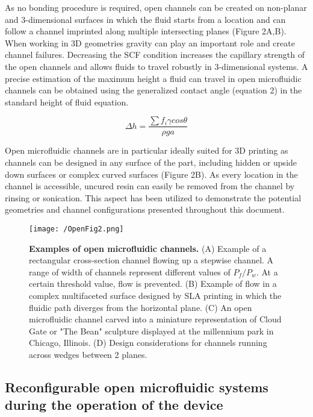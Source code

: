 As no bonding procedure is required, open channels can be created on non-planar and 3-dimensional surfaces in which the fluid starts from a location and can follow a channel imprinted along multiple intersecting planes (Figure 2A,B). When working in 3D geometries gravity can play an important role and create channel failures. Decreasing the SCF condition increases the capillary strength of the open channels and allows fluids to travel robustly in 3-dimensional systems. A precise estimation of the maximum height a fluid can travel in open microfluidic channels can be obtained using the generalized contact angle (equation 2) in the standard height of fluid equation.

\begin{equation}
    \Delta h = \frac{\sum f_{i}\gamma cos \theta}{\rho g a }
\end{equation}

Open microfluidic channels are in particular ideally suited for 3D printing as channels can be designed in any surface of the part, including hidden or upside down surfaces or complex curved surfaces (Figure 2B). As every location in the channel is accessible, uncured resin can easily be removed from the channel by rinsing or sonication. This aspect has been utilized to demonstrate the potential geometries and channel configurations presented throughout this document.

\begin{figure}[h!] %
\centering
\texttt{[image: /OpenFig2.png]}
\caption[\textbf{Examples of open microfluidic channels}]{\textbf{Examples of open microfluidic channels.} (A) Example of a rectangular cross-section channel flowing up a stepwise channel. A range of width of channels represent different values of $P_f/P_w$. At a certain threshold value, flow is prevented. (B) Example of flow in a complex multifaceted surface designed by SLA printing in which the fluidic path diverges from the horizontal plane. (C) An open microfluidic channel carved into a miniature representation of Cloud Gate or "The Bean" sculpture displayed at the millennium park in Chicago, Illinois. (D) Design considerations for channels running across wedges between 2 planes.}
\label{figure:OpenFig2}
\end{figure}



\subsection{Reconfigurable open microfluidic systems during the operation of the device}

